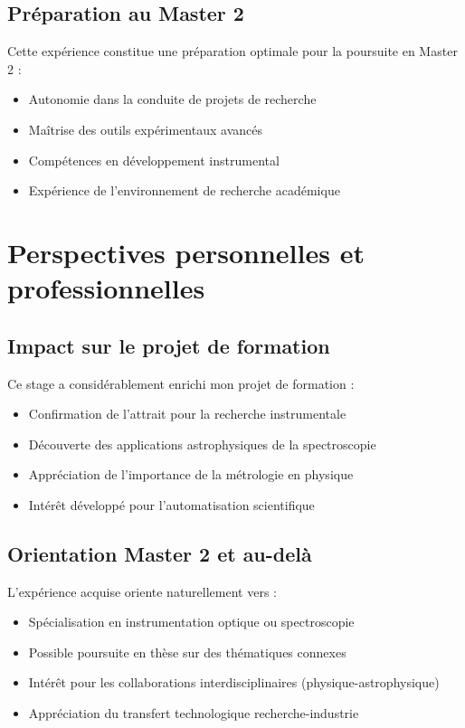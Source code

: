 \subsection{Préparation au Master 2}

Cette expérience constitue une préparation optimale pour la poursuite en Master 2 :
\begin{itemize}
    \item Autonomie dans la conduite de projets de recherche
    \item Maîtrise des outils expérimentaux avancés
    \item Compétences en développement instrumental
    \item Expérience de l'environnement de recherche académique
\end{itemize}

\section{Perspectives personnelles et professionnelles}

\subsection{Impact sur le projet de formation}

Ce stage a considérablement enrichi mon projet de formation :
\begin{itemize}
    \item Confirmation de l'attrait pour la recherche instrumentale
    \item Découverte des applications astrophysiques de la spectroscopie
    \item Appréciation de l'importance de la métrologie en physique
    \item Intérêt développé pour l'automatisation scientifique
\end{itemize}

\subsection{Orientation Master 2 et au-delà}

L'expérience acquise oriente naturellement vers :
\begin{itemize}
    \item Spécialisation en instrumentation optique ou spectroscopie
    \item Possible poursuite en thèse sur des thématiques connexes
    \item Intérêt pour les collaborations interdisciplinaires (physique-astrophysique)
    \item Appréciation du transfert technologique recherche-industrie
\end{itemize}

